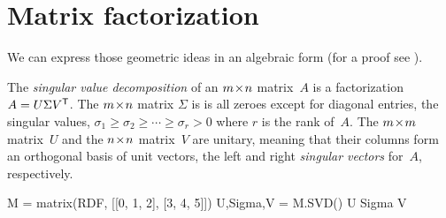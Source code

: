 \section{Matrix factorization}

We can express those geometric ideas in an algebraic form
(for a proof see \cite{TrefethenBau97}).

The \textit{singular value decomposition} of an $m \! \times \! n$ matrix~$A$
is a factorization $A=U\Sigma {{V}^{\textsf{T}}}$.
The $m \! \times \! n$ matrix $\Sigma$ is 
is all zeroes except for diagonal entries, the singular values, 
$\sigma_1\geq \sigma_2 \geq \cdots \geq \sigma_r> 0$ where $r$ is the
rank of~$A$.
The $m \! \times \! m$ matrix~$U$ and the $n \! \times \! n$ matrix~$V$ are unitary, meaning
that their columns form an orthogonal basis of unit vectors, the left and 
right \textit{singular vectors} for~$A$, respectively. 
\begin{sageoutput}
M = matrix(RDF, [[0, 1, 2], [3, 4, 5]])
U,Sigma,V = M.SVD()
U
Sigma
V  
\end{sageoutput}


